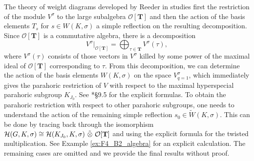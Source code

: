 The theory of weight diagrams developed by Reeder in \cite{Reeder1997} studies first the restriction of the module $V^\sigma$ to the large subalgebra $\mathcal{O}[\mathbf{T}]$ and then the action of the basis elements $T_s$ for  $s\in W(K,\sigma)$ a simple reflection on the resulting decomposition. Since $\mathcal{O}[\mathbf{T}]$ is a commutative algebra, there is a decomposition
$$V^\sigma|_{\mathcal{O}[\mathbf{T}]}=\bigoplus_{\tau\in\mathbf{T}}V^\sigma(\tau),$$
where $V^\sigma(\tau)$ consists of those vectors in $V^\sigma$ killed by some power of the maximal ideal of $\mathcal{O}[\mathbf{T}]$ corresponding to $\tau$. From this decomposition, we can determine the action of the basis elements $W(K,\sigma)$ on the space $V^\sigma_{q=1}$, which immediately gives the parahoric restriction of $V$ with respect to the maximal hyperspecial parahoric subgroup $K_{J_0}$. See \cite{Reeder2000}*{\S 9.5} for the explicit formulas. To obtain the parahoric restriction with respect to other parahoric subgroups, one needs to understand the action of the remaining simple reflection $s_0\in\tilde{W}(K,\sigma)$. This can be done by tracing back through the isomorphism $\cH(G,K,\sigma)\cong\cH(K_{J_0},K,\sigma)\ \tilde\otimes\ \mathcal{O}[\mathbf{T}]$ and using the explicit formula for the twisted multiplication. See Example \ref{ex:F4_B2_algebra} for an explicit calculation. The remaining cases are omitted and we provide the final results without proof.




\newpage

